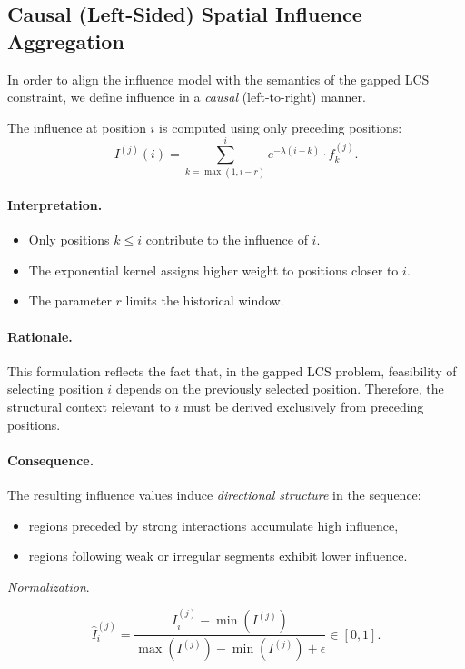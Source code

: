 \documentclass[11pt,a4paper]{article}
\begin{document}
 
\subsection{Causal (Left-Sided) Spatial Influence Aggregation}

In order to align the influence model with the semantics of the gapped LCS constraint, we define influence in a \emph{causal} (left-to-right) manner.

The influence at position $i$ is computed using only preceding positions:
$$
I^{(j)}(i) = \sum_{k=\max(1,i-r)}^{i} e^{-\lambda (i-k)} \cdot f^{(j)}_k.
$$

\paragraph{Interpretation.}
\begin{itemize}
	\item Only positions $k \leq i$ contribute to the influence of $i$.
	\item The exponential kernel assigns higher weight to positions closer to $i$.
	\item The parameter $r$ limits the historical window.
\end{itemize}

\paragraph{Rationale.}
This formulation reflects the fact that, in the gapped LCS problem, feasibility of selecting position $i$ depends on the previously selected position. Therefore, the structural context relevant to $i$ must be derived exclusively from preceding positions.

\paragraph{Consequence.}
The resulting influence values induce \emph{directional structure} in the sequence:
\begin{itemize}
	\item regions preceded by strong interactions accumulate high influence,
	\item regions following weak or irregular segments exhibit lower influence.
\end{itemize}

  
 \textit{Normalization}. 
 
 $$
 \hat{I}^{(j)}_i = \frac{I^{(j)}_i - \min(I^{(j)})}{\max(I^{(j)}) - \min(I^{(j)}) + \epsilon} \in \left[0, 1 \right].
$$
 
\end{document}
